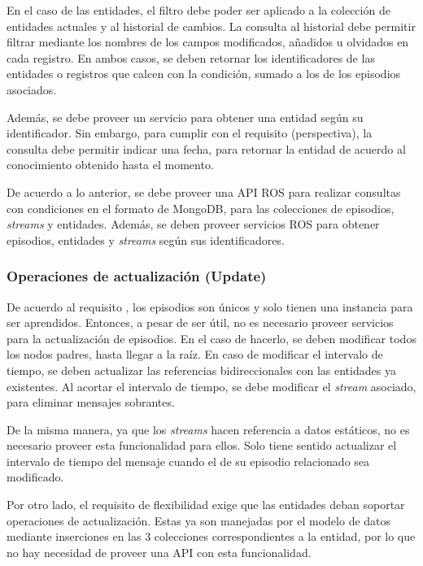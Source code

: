 En el caso de las entidades, el filtro debe poder ser aplicado a la colección de entidades actuales y al historial de cambios. La consulta al historial debe permitir filtrar mediante los nombres de los campos modificados, añadidos u olvidados en cada registro. En ambos casos, se deben retornar los identificadores de las entidades o registros que calcen con la condición, sumado a los de los episodios asociados.

Además, se debe proveer un servicio para obtener una entidad según su identificador. Sin embargo, para cumplir con el requisito  (perspectiva), la consulta debe permitir indicar una fecha, para retornar la entidad de acuerdo al conocimiento obtenido hasta el momento.

De acuerdo a lo anterior, se debe proveer una API ROS para realizar consultas con condiciones en el formato de MongoDB, para las colecciones de episodios, \textit{streams} y entidades. Además, se deben proveer servicios ROS para obtener episodios, entidades y \textit{streams} según sus identificadores.

\subsubsection{Operaciones de actualización (Update)}

De acuerdo al requisito , los episodios son únicos y solo tienen una instancia para ser aprendidos. Entonces, a pesar de ser útil, no es necesario proveer servicios para la actualización de episodios. En el caso de hacerlo, se deben modificar todos los nodos padres, hasta llegar a la raíz. En caso de modificar el intervalo de tiempo, se deben actualizar las referencias bidireccionales con las entidades ya existentes. Al acortar el intervalo de tiempo, se debe modificar el \textit{stream} asociado, para eliminar mensajes sobrantes.

 De la misma manera, ya que los \textit{streams} hacen referencia a datos estáticos, no es necesario proveer esta funcionalidad para ellos. Solo tiene sentido actualizar el intervalo de tiempo del mensaje cuando el de su episodio relacionado sea modificado.

Por otro lado, el requisito de flexibilidad  exige que las entidades deban soportar operaciones de actualización. Estas ya son manejadas por el modelo de datos mediante inserciones en las 3 colecciones correspondientes a la entidad, por lo que no hay necesidad de proveer una API con esta funcionalidad.

